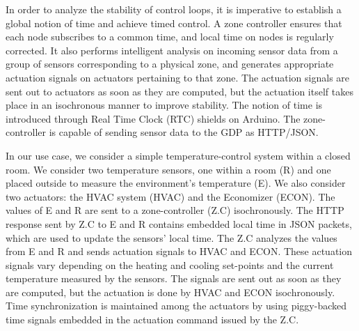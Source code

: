 In order to analyze the stability of control loops, it is imperative to establish a global notion of time and achieve timed control. A zone controller ensures that each node subscribes to a common time, and local time on nodes is regularly corrected. It also performs intelligent analysis on incoming sensor data from a group of sensors corresponding to a physical zone, and generates appropriate actuation signals on actuators pertaining to that zone. The actuation signals are sent out to actuators as soon as they are computed, but the actuation itself takes place in an isochronous manner to improve stability. The notion of time is introduced through Real Time Clock (RTC) shields on Arduino. The zone-controller is capable of sending sensor data to the GDP as HTTP/JSON.

In our use case, we consider a simple temperature-control system within a closed room. We consider two temperature sensors, one within a room (R) and one placed outside to measure the environment’s temperature (E). We also consider two actuators: the HVAC system (HVAC) and the Economizer (ECON). The values of E and R are sent to a zone-controller (Z.C) isochronously. The HTTP response sent by Z.C to E and R contains embedded local time in JSON packets, which are used to update the sensors’ local time. The Z.C analyzes the values from E and R and sends actuation signals to HVAC and ECON. These actuation signals vary depending on the heating and cooling set-points and the current temperature measured by the sensors. The signals are sent out as soon as they are computed, but the actuation is done by HVAC and ECON isochronously. Time synchronization is maintained among the actuators by using piggy-backed time signals embedded in the actuation command issued by the Z.C.